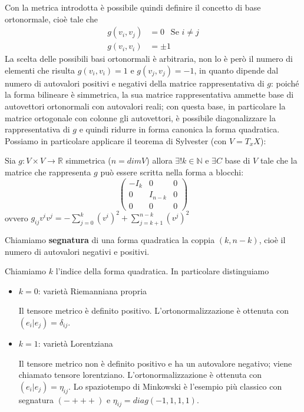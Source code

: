 Con la metrica introdotta è possibile quindi definire il concetto di base ortonormale, cioè tale che
\begin{align*}
    g(v_i,v_j) &= 0 \ \ \text{ Se $i\neq j$} \\
    g(v_i,v_i) &= \pm 1 
\end{align*}
La scelta delle possibili basi ortonormali è arbitraria, non lo è però il numero di elementi che risulta $g(v_i,v_i)=1$ e $g(v_j,v_j)=-1$, in quanto dipende dal numero di autovalori positivi e negativi della matrice rappresentativa di $g$: poiché la forma bilineare è simmetrica, la sua matrice rappresentativa ammette base di autovettori ortonormali con autovalori reali; con questa base, in particolare la matrice ortogonale con colonne gli autovettori, è possibile diagonalizzare la rappresentativa di $g$ e quindi ridurre in forma canonica la forma quadratica. Possiamo in particolare applicare il teorema di Sylvester (con $V=T_x X$):
\begin{teorema}[di Sylvester]
Sia $g: V\times V \rightarrow \mathbb{R} $ simmetrica ($n=dimV$) allora $\exists! k \in \mathbb{N}$ e $\exists C$ base di $V$ tale che la matrice che rappresenta $g$ può essere scritta nella forma a blocchi:
\begin{equation*}
    \begin{pmatrix}
    -I_{k} & 0 & 0 \\
    0 & I_{n-k} & 0 \\
    0 & 0 & 0
    \end{pmatrix}
\end{equation*}
ovvero $g_{ij}v^iv^j= - \sum_{j=0}^{k}(v^i)^2 + \sum_{j=k+1}^{n-k}(v^j)^2$
\end{teorema}
\begin{definizione}
Chiamiamo \textbf{segnatura} di una forma quadratica la coppia $(k, n-k)$, cioè il numero di autovalori negativi e positivi.
\end{definizione}
Chiamiamo $k$ l'indice della forma quadratica. In particolare distinguiamo
\begin{itemize}
    \item $k=0$: varietà Riemanniana propria
    
    Il tensore metrico è definito positivo. L'ortonormalizzazione è ottenuta con $(e_i|e_j)= \delta_{ij}$.
    \item $k=1$: varietà Lorentziana
    
    Il tensore metrico non è definito positivo e ha un autovalore negativo; viene chiamato tensore lorentziano. L'ortonormalizzazione è ottenuta con $(e_i|e_j)=\eta_{ij}$. Lo spaziotempo di Minkowski è l'esempio più classico con segnatura $(-+++)$ e $\eta_{ij}=diag(-1,1,1,1)$.
\end{itemize}

